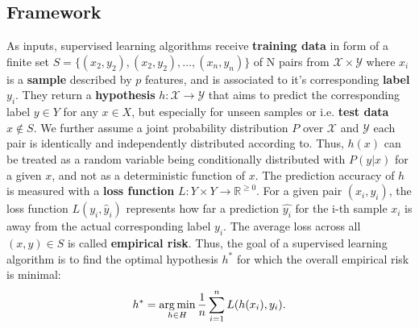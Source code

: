 \subsection{Framework}
As inputs, supervised learning algorithms receive \textbf{training data} in form of a finite set $ S = \{({x}_{2}, y_2), ({x}_{2}, y_2), \dots, ({x}_{n}, y_n)\}$ of N pairs from $ \mathcal{X} \times \mathcal{Y} $ where $ x_i $ is a \textbf{sample} described by $ p $ features, and is associated to it's corresponding \textbf{label} $ y_i $.
They return a \textbf{hypothesis} $ h: \mathcal{X} \to \mathcal{Y} $ that aims to predict the corresponding label $ y \in Y $ for any $ x \in X $, but especially for unseen samples or i.e. \textbf{test data} $ x \notin S $.
We further assume a joint probability distribution $ P $ over $ \mathcal{X} $ and $ \mathcal{Y} $ each pair is identically and independently distributed according to. 
Thus, $ h(x) $ can be treated as a random variable being conditionally distributed with $ P(y | x) $ for a given $ x $, and not as a deterministic function of $ x $. 
The prediction accuracy of $ h $ is measured with a  \textbf{loss function} $ L : Y \times Y \to \mathbb{R}^{\geq 0}$.
For a given pair $ ({x}_i, y_i) $, the loss function $ L(y_i, \hat{y}_i) $ represents how far a prediction $ \hat{y_i} $ for the i-th sample $ x_i $ is away from the actual corresponding label $ y_i $. 
The average loss across all $ (x,y) \in S $ is called \textbf{empirical risk}.
Thus, the goal of a supervised learning algorithm is to find the optimal hypothesis $ h^* $ for which the overall empirical risk is minimal: 
\begin{equation}
	h^* = \operatorname*{arg\,min}_{h \in H} \dfrac{1}{n} \sum_{i=1}^{n} L(h(x_i), y_i).
\end{equation}

